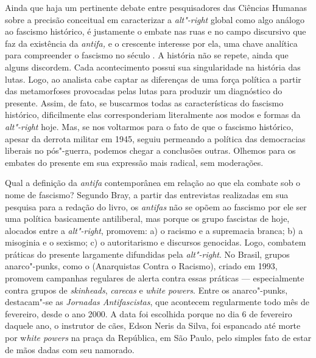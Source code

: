 Ainda que haja um pertinente debate entre pesquisadores das Ciências
Humanas sobre a precisão conceitual em caracterizar a \emph{alt"-right}
global como algo análogo ao fascismo histórico, é justamente o embate
nas ruas e no campo discursivo que faz da existência da \emph{antifa,} e
o crescente interesse por ela, uma chave analítica para compreender o
fascismo no século . A história não se repete, ainda que alguns
discordem. Cada acontecimento possui sua singularidade na história das
lutas. Logo, ao analista cabe captar as diferenças de uma força política
a partir das metamorfoses provocadas pelas lutas para produzir um
diagnóstico do presente. Assim, de fato, se buscarmos todas as
características do fascismo histórico, dificilmente elas corresponderiam
literalmente aos modos e formas da \emph{alt"-right} hoje. Mas, se nos
voltarmos para o fato de que o fascismo histórico, apesar da derrota
militar em 1945, seguiu permeando a política das democracias liberais no
pós"-guerra, podemos chegar a conclusões outras. Olhemos para os embates
do presente em sua expressão mais radical, sem moderações.

Qual a definição da \emph{antifa} contemporânea em relação ao que ela
combate sob o nome de fascismo? Segundo Bray, a partir das entrevistas
realizadas em sua pesquisa para a redação do livro, os \emph{antifas}
não se opõem ao fascismo por ele ser uma política basicamente
antiliberal, mas porque os grupo fascistas de hoje, alocados entre a
\emph{alt"-right}, promovem: a) o racismo e a supremacia branca; b) a
misoginia e o sexismo; c) o autoritarismo e discursos genocidas. Logo,
combatem práticas do presente largamente difundidas pela
\emph{alt"-right}. No Brasil, grupos anarco"-punks, como o 
(Anarquistas Contra o Racismo), criado em 1993, promovem campanhas
regulares de alerta contra essas práticas --- especialmente contra grupos
de \emph{skinheads}, \emph{carecas} e \emph{white powers}. Entre os
anarco"-punks, destacam"-se as \emph{Jornadas Antifascistas}, que
acontecem regularmente todo mês de fevereiro, desde o ano 2000. A data
foi escolhida porque no dia 6 de fevereiro daquele ano, o instrutor de
cães, Edson Neris da Silva, foi espancado até morte por w\emph{hite
powers} na praça da República, em São Paulo, pelo simples fato de estar
de mãos dadas com seu namorado.

